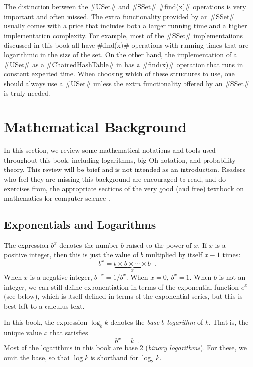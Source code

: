 The distinction between the #USet# and #SSet# #find(x)# operations is very important and often missed.  The extra functionality provided by an #SSet# usually comes with a price that includes both a larger running time and a higher implementation complexity.  For example, most of the #SSet# implementations discussed in this book all have #find(x)# operations with running times that are logarithmic in the size of the set.  On the other hand, the implementation of a #USet# as a #ChainedHashTable# in  has a #find(x)# operation that runs in constant expected time.  When choosing which of these structures to use, one should always use a #USet# unless the extra functionality offered by an #SSet# is truly needed.


\section{Mathematical Background}

In this section, we review some mathematical notations and tools used throughout this book, including logarithms, big-Oh notation, and probability theory.  This review will be brief and is not intended as an introduction. Readers who feel they are missing this background are encouraged to read, and do exercises from, the appropriate sections of the very good (and free) textbook on mathematics for computer science \cite{llm11}.

\subsection{Exponentials and Logarithms}

The expression $b^x$ denotes the number $b$ raised to the power of $x$.  If $x$ is a positive integer, then this is just the value of $b$ multiplied by itself $x-1$ times:
\[
    b^x = \underbrace{b\times b\times \cdots \times b}_{x} \enspace .
\]
When $x$ is a negative integer, $b^{-x}=1/b^{x}$.  When $x=0$, $b^x=1$.  When $b$ is not an integer, we can still define exponentiation in terms of the exponential function $e^x$ (see below), which is itself defined in terms of the exponential series, but this is best left to a calculus text.

In this book, the expression $\log_b k$ denotes the \emph{base-$b$ logarithm} of $k$.  That is, the unique value $x$ that satisfies
\[
    b^{x} = k  \enspace .
\]
Most of the logarithms in this book are base 2 (\emph{binary logarithms}).    For these, we omit the base, so that $\log k$ is shorthand for $\log_2 k$.

